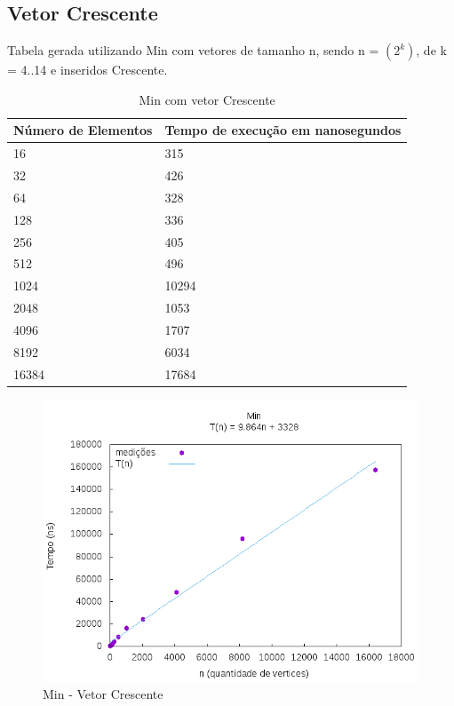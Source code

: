 \documentclass[12pt,a4paper,twoside]{report}
\begin{document}
\subsection{Vetor Crescente}
Tabela gerada utilizando Min com vetores de tamanho n, sendo n = $(2^k)$, de k = 4..14 e inseridos Crescente.
\begin{table}[H]
\centering
\caption{Min com vetor Crescente}
\label{my-label}
\begin{tabular}{|l|l|}
\hline
\multicolumn{1}{|c|}{\textbf{Número de Elementos}} & \multicolumn{1}{c|}{\textbf{Tempo de execução em nanosegundos}} \\ \hline
16 & 315 \\ \hline
32 & 426 \\ \hline
64 & 328 \\ \hline
128 & 336 \\ \hline
256 & 405 \\ \hline
512 & 496 \\ \hline
1024 & 10294 \\ \hline
2048 & 1053 \\ \hline
4096 & 1707 \\ \hline
8192 & 6034 \\ \hline
16384 & 17684 \\ \hline

\end{tabular}
\end{table}

\begin{figure}[H]
    \centering
    \includegraphics[width=0.7\linewidth]{graficos/Min/Crescente/Min.png}
  \caption{Min - Vetor Crescente}
\end{figure}
\end{document}
